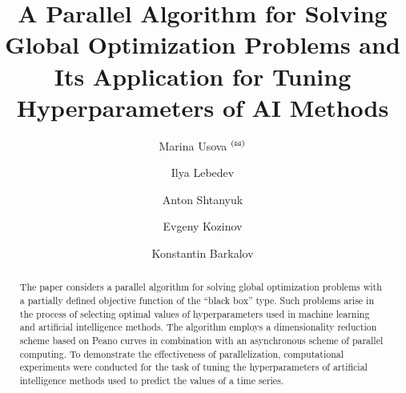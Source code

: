 \documentclass[runningheads]{llncs}
\def\letter{$^{\textrm{(\Letter)}}$}
\begin{document}
%
\title{A Parallel Algorithm for Solving Global Optimization Problems and Its Application for Tuning Hyperparameters of AI Methods}
%
%
\author{Marina Usova \letter {} \and
Ilya Lebedev  \and
Anton Shtanyuk \and
Evgeny Kozinov  \and
Konstantin Barkalov  
}
%
%
%
\maketitle              %
%
\begin{abstract}
The paper considers a parallel algorithm for solving global optimization problems with a partially defined objective function of the ``black box'' type. Such problems arise in the process of selecting optimal values of hyperparameters used in machine learning and artificial intelligence methods. The algorithm employs a dimensionality reduction scheme based on Peano curves in combination with an asynchronous scheme of parallel computing. To demonstrate the effectiveness of parallelization, computational experiments were conducted for the task of tuning the hyperparameters of artificial intelligence methods used to predict the values of a time series.

\end{abstract}
%
%
%
\end{document}
